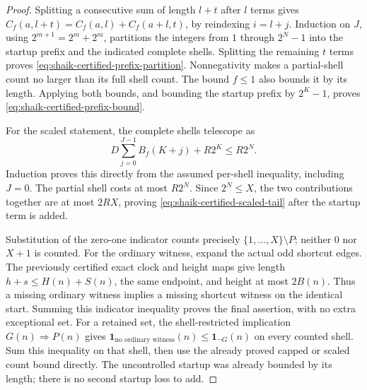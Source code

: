 \documentclass[11pt]{article}
\theoremstyle{remark}\newtheorem{remark}[proposition]{Remark}
\begin{document}
\begin{proof}
Splitting a consecutive sum of length \(l+t\) after \(l\) terms gives
\(C_f(a,l+t)=C_f(a,l)+C_f(a+l,t)\), by reindexing \(i=l+j\).
Induction on \(J\), using \(2^{m+1}=2^m+2^m\), partitions the
integers from \(1\) through \(2^N-1\) into the startup prefix
and the indicated complete shells. Splitting the remaining \(t\)
terms proves \eqref{eq:shaik-certified-prefix-partition}.
Nonnegativity makes a partial-shell count no larger than its full
shell count. The bound \(f\le1\) also bounds it by its length.
Applying both bounds, and bounding the startup prefix by \(2^K-1\),
proves \eqref{eq:shaik-certified-prefix-bound}.

For the scaled statement, the complete shells telescope as
\[
 D\sum_{j=0}^{J-1}B_f(K+j)+R2^K\le R2^N.
\]
Induction proves this directly from the assumed per-shell inequality,
including \(J=0\). The partial shell costs at most \(R2^N\).
Since \(2^N\le X\), the two contributions together are at most
\(2RX\), proving \eqref{eq:shaik-certified-scaled-tail} after the
startup term is added.

Substitution of the zero-one indicator counts precisely
\(\{1,\ldots,X\}\setminus P\); neither \(0\) nor \(X+1\) is counted.
For the ordinary witness, expand the actual odd shortcut edges.
The previously certified exact clock and height maps give length
\(h+s\le H(n)+S(n)\), the same endpoint, and height at most \(2B(n)\).
Thus a missing ordinary witness implies a missing shortcut witness
on the identical start. Summing this indicator inequality proves
the final assertion, with no extra exceptional set. For a retained set,
the shell-restricted implication \(G(n)\Rightarrow P(n)\) gives
\(\boldsymbol1_{\text{no ordinary witness}}(n)
 \le\boldsymbol1_{\neg G}(n)\) on every counted shell.
Sum this inequality on that shell, then use the already proved capped
or scaled count bound directly. The uncontrolled startup was already
bounded by its length; there is no second startup loss to add.
\end{proof}
\end{document}
